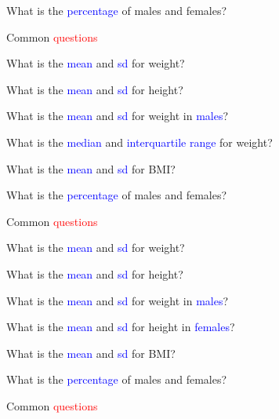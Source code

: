 \documentclass{presentatiesmetlogo}
\begin{document}
\item What is the  \textcolor{blue}{percentage} of males and females?
\eitemt
\eitem
\bitem
\item Common \textcolor{red}{questions}
\newline
\bitemt
\item What is the \textcolor{blue}{mean} and \textcolor{blue}{sd} for weight?
\item What is the  \textcolor{blue}{mean} and \textcolor{blue}{sd} for height?
\item What is the \textcolor{blue}{mean} and \textcolor{blue}{sd} for weight in \textcolor{blue}{males}?
\item {}
\item What is the \textcolor{blue}{median} and \textcolor{blue}{interquartile range} for weight?
\item What is the \textcolor{blue}{mean} and \textcolor{blue}{sd} for BMI?
\item What is the  \textcolor{blue}{percentage} of males and females?
\eitemt
\eitem
\bitem
\item Common \textcolor{red}{questions}
\newline
\bitemt
\item What is the \textcolor{blue}{mean} and \textcolor{blue}{sd} for weight?
\item What is the  \textcolor{blue}{mean} and \textcolor{blue}{sd} for height?
\item What is the \textcolor{blue}{mean} and \textcolor{blue}{sd} for weight in \textcolor{blue}{males}?
\item What is the \textcolor{blue}{mean} and \textcolor{blue}{sd} for height in \textcolor{blue}{females}?
\item {}
\item What is the \textcolor{blue}{mean} and \textcolor{blue}{sd} for BMI?
\item What is the  \textcolor{blue}{percentage} of males and females?
\eitemt
\eitem
\bitem
\item Common \textcolor{red}{questions}
\end{document}
